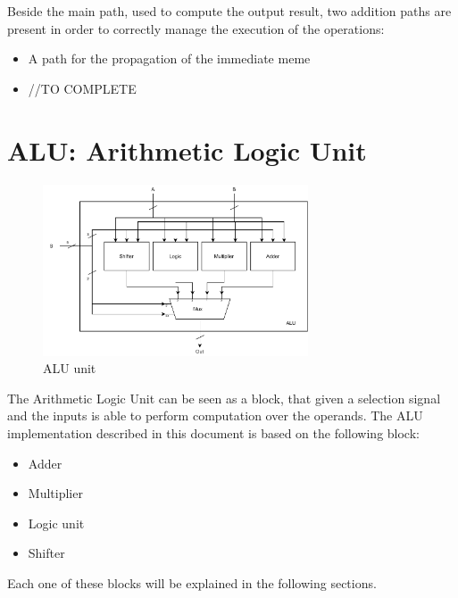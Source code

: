 Beside the main path, used to compute the output result, two addition paths are present in order to correctly manage the execution of the operations:
\begin{itemize}
	\item A path for the propagation of the immediate meme
	\item //TO COMPLETE
\end{itemize}

\section{ALU: Arithmetic Logic Unit}
\begin{figure}[h]
	\centering
	\includegraphics[width=0.7\textwidth]{chapters/5_ExecuteStage/images/ALU.pdf}
	\caption{ALU unit}
	\label{fig:ALU}	
\end{figure}
The Arithmetic Logic Unit can be seen as a block, that given a selection signal and the inputs is able to perform computation over the operands. The ALU implementation described in this document is based on the following block:
\begin{itemize}
	\itemsep0sp
	\item Adder
	\item Multiplier
	\item Logic unit
	\item Shifter
\end{itemize}
Each one of these blocks will be explained in the following sections.


